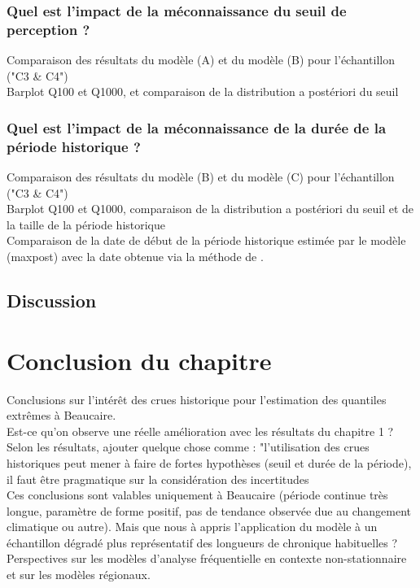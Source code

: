 \documentclass[11pt]{article}
\begin{document}
		\subsubsection{Quel est l'impact de la méconnaissance du seuil de perception ?}
	Comparaison des résultats du modèle (A) et du modèle (B) pour l'échantillon ("C3 \& C4")\\
	Barplot Q100 et Q1000, et comparaison de la distribution a postériori du seuil
	
		\subsubsection{Quel est l'impact de la méconnaissance de la durée de la période historique ?}
	
	Comparaison des résultats du modèle (B) et du modèle (C) pour l'échantillon ("C3 \& C4")\\
	Barplot Q100 et Q1000, comparaison de la distribution a postériori du seuil et de la taille de la période historique\\
	Comparaison de la date de début de la période historique estimée par le modèle (maxpost) avec la date obtenue via la méthode de \cite{prosdocimi_german_2018}.\\

	
	\subsection{Discussion}
	
\section{Conclusion du chapitre}
	Conclusions sur l'intérêt des crues historique pour l'estimation des quantiles extrêmes à Beaucaire. \\
	Est-ce qu'on observe une réelle amélioration avec les résultats du chapitre 1 ?\\
	Selon les résultats, ajouter quelque chose comme : "l'utilisation des crues historiques peut mener à faire de fortes hypothèses (seuil et durée de la période), il faut être pragmatique sur la considération des incertitudes\\
	Ces conclusions sont valables uniquement à Beaucaire (période continue très longue, paramètre de forme positif, pas de tendance observée due au changement climatique ou autre). Mais que nous à appris l'application du modèle à un échantillon dégradé plus représentatif des longueurs de chronique habituelles ?\\
	Perspectives sur les modèles d'analyse fréquentielle en contexte non-stationnaire et sur les modèles régionaux.  

\printbibliography
\end{document}

